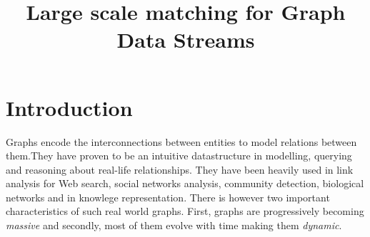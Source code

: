 \documentclass{scrartcl}
\begin{document}
  
 \title{Large scale matching for Graph Data Streams}
 \maketitle

\section{Introduction}
Graphs encode the interconnections between entities to model relations between them.They have proven to be an intuitive datastructure in modelling, querying and reasoning about real-life relationships. They have been heavily used in link analysis for Web search, social networks analysis, community detection, biological networks and in knowlege representation. There is however two important characteristics of such real world graphs. First, graphs are progressively becoming \emph{massive} and secondly, most of them evolve with time making them \emph{dynamic}.



%


\end{document}
